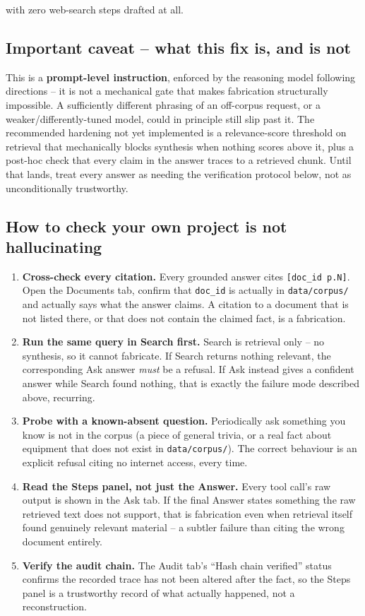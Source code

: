 \documentclass[11pt,a4paper]{article}
\newcommand{\code}[1]{\texttt{\small #1}}
\newcommand{\term}[1]{\textbf{\color{accent}#1}}
\begin{document}
with zero web-search steps drafted at all.

\subsection{Important caveat -- what this fix is, and is not}

This is a \term{prompt-level instruction}, enforced by the reasoning model
following directions -- it is not a mechanical gate that makes fabrication
structurally impossible. A sufficiently different phrasing of an off-corpus
request, or a weaker/differently-tuned model, could in principle still slip
past it. The recommended hardening not yet implemented is a relevance-score
threshold on retrieval that mechanically blocks synthesis when nothing scores
above it, plus a post-hoc check that every claim in the answer traces to a
retrieved chunk. Until that lands, treat every answer as needing the
verification protocol below, not as unconditionally trustworthy.

\subsection{How to check your own project is not hallucinating}

\begin{enumerate}
  \item \textbf{Cross-check every citation.} Every grounded answer cites
        \code{[doc\_id p.N]}. Open the Documents tab, confirm that
        \code{doc\_id} is actually in \code{data/corpus/} and actually says
        what the answer claims. A citation to a document that is not listed
        there, or that does not contain the claimed fact, is a fabrication.
  \item \textbf{Run the same query in Search first.} Search is retrieval only
        -- no synthesis, so it cannot fabricate. If Search returns nothing
        relevant, the corresponding Ask answer \emph{must} be a refusal. If
        Ask instead gives a confident answer while Search found nothing, that
        is exactly the failure mode described above, recurring.
  \item \textbf{Probe with a known-absent question.} Periodically ask
        something you know is not in the corpus (a piece of general trivia,
        or a real fact about equipment that does not exist in
        \code{data/corpus/}). The correct behaviour is an explicit refusal
        citing no internet access, every time.
  \item \textbf{Read the Steps panel, not just the Answer.} Every tool call's
        raw output is shown in the Ask tab. If the final Answer states
        something the raw retrieved text does not support, that is
        fabrication even when retrieval itself found genuinely relevant
        material -- a subtler failure than citing the wrong document
        entirely.
  \item \textbf{Verify the audit chain.} The Audit tab's ``Hash chain
        verified'' status confirms the recorded trace has not been altered
        after the fact, so the Steps panel is a trustworthy record of what
        actually happened, not a reconstruction.
\end{enumerate}
\end{document}
